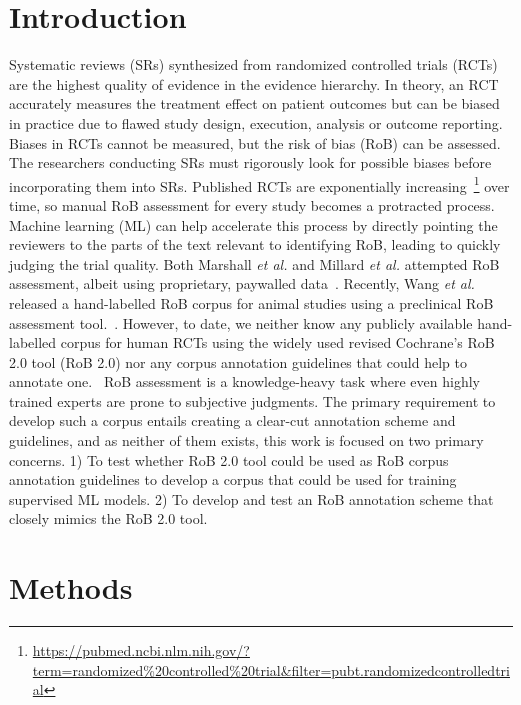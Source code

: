 \documentclass{IOS-Book-Article}
\begin{document}
\section{Introduction}
\label{sec:intro}
%
Systematic reviews (SRs) synthesized from randomized controlled trials (RCTs) are the highest quality of evidence in the evidence hierarchy.
In theory, an RCT accurately measures the treatment effect on patient outcomes but can be biased in practice due to flawed study design, execution, analysis or outcome reporting.\cite{hariton2018randomised}
Biases in RCTs cannot be measured, but the risk of bias (RoB) can be assessed.
The researchers conducting SRs must rigorously look for possible biases before incorporating them into SRs.
Published RCTs are exponentially increasing~\footnote{\url{https://pubmed.ncbi.nlm.nih.gov/?term=randomized\%20controlled\%20trial&filter=pubt.randomizedcontrolledtrial}} over time, so manual RoB assessment for every study becomes a protracted process.
Machine learning (ML) can help accelerate this process by directly pointing the reviewers to the parts of the text relevant to identifying RoB, leading to quickly judging the trial quality.
Both Marshall \textit{et al.} and Millard \textit{et al.} attempted RoB assessment, albeit using proprietary, paywalled data~\cite{marshall2015automating,millard2016machine}.
Recently, Wang \textit{et al.} released a hand-labelled RoB corpus for animal studies using a preclinical RoB assessment tool.~\cite{wang2022risk}.
However, to date, we neither know any publicly available hand-labelled corpus for human RCTs using the widely used revised Cochrane's RoB 2.0 tool (RoB 2.0) nor any corpus annotation guidelines that could help to annotate one.~\cite{sterne2019rob,lansbury2020co}
RoB assessment is a knowledge-heavy task where even highly trained experts are prone to subjective judgments.
The primary requirement to develop such a corpus entails creating a clear-cut annotation scheme and guidelines, and as neither of them exists, this work is focused on two primary concerns.
1) To test whether RoB 2.0 tool could be used as RoB corpus annotation guidelines to develop a corpus that could be used for training supervised ML models.
2) To develop and test an RoB annotation scheme that closely mimics the RoB 2.0 tool.~\cite{sterne2019rob}
%
%
%
\section{Methods}
\label{sec:methods}
%
\end{document}
